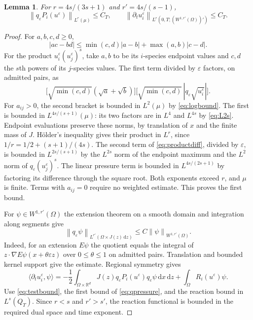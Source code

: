 \documentclass[11pt]{article}
\newtheorem{lemma}[theorem]{Lemma}
\newcommand{\R}{\mathbb R}
\newcommand{\eps}{\varepsilon}
\newcommand{\dd}{\,\mathrm d}
\newcommand{\Om}{\Omega}
\newcommand{\qe}{q_\eps}
\newcommand{\norm}[1]{\left\lVert#1\right\rVert}
\begin{document}
\begin{lemma}\label{lem:pressure}
For $r=4s/(3s+1)$ and $r'=4s/(s-1)$,
\begin{equation}\label{eq:qpressure}
 \norm{\qe P_i(u^\eps)}_{L^r(\mu)}\leq C_T,\qquad
 \norm{\partial_tu_i^\eps}_{L^r(0,T;(W^{1,r'}(\Om))')}\leq C_T.
\end{equation}
\end{lemma}
\begin{proof}
For $a,b,c,d\geq0$,
\begin{equation}\label{eq:productdiff}
 |ac-bd|\leq\min(c,d)|a-b|+\max(a,b)|c-d|.
\end{equation}
For the product $u_i^\eps(u_j^\eps)^s$, take $a,b$ to be its $i$-species
endpoint values and $c,d$ the $s$th powers of its $j$-species values.
The first term divided by $\eps$ factors, on admitted pairs, as
\[
 \bigl[\sqrt{\min(c,d)}(\sqrt a+\sqrt b)\bigr]
       \bigl[\sqrt{\min(c,d)}\,|\qe\sqrt{u_i^\eps}|\bigr].
\]
For $a_{ij}>0$, the second bracket is bounded in $L^2(\mu)$ by
\eqref{eq:logbound}. The first is bounded in $L^{4s/(s+1)}(\mu)$:
its two factors are in $L^4$ and $L^{4s}$ by \eqref{eq:L2s}.
Endpoint evaluations preserve these norms, by translation of $x$ and the
finite mass of $J$. H\"older's inequality gives their product in $L^r$,
since $1/r=1/2+(s+1)/(4s)$.
The second term of \eqref{eq:productdiff}, divided by $\eps$, is bounded
in $L^{2s/(s+1)}$ by the $L^{2s}$ norm of the endpoint maximum and the
$L^2$ norm of $\qe(u_j^\eps)^s$. The linear pressure term is bounded
in $L^{4s/(2s+1)}$ by factoring its difference through the square root.
Both exponents exceed $r$, and $\mu$ is finite. Terms with $a_{ij}=0$
require no weighted estimate. This proves the first bound.

For $\psi\in W^{1,r'}(\Om)$ the extension theorem on a smooth domain
\cite[Theorem 9.7]{Brezis} and integration along segments give
\begin{equation}\label{eq:testbound}
 \norm{\qe\psi}_{L^{r'}(\Om\times J(z)\dd z)}
                  \leq C\norm{\psi}_{W^{1,r'}(\Om)}.
\end{equation}
Indeed, for an extension $E\psi$ the quotient equals the integral of
$z\cdot\nabla E\psi(x+\theta\eps z)$ over $0\leq\theta\leq1$ on
admitted pairs. Translation and bounded kernel support give the estimate.
Regional symmetry gives
\begin{equation}\label{eq:bilinear}
 \langle\partial_tu_i^\eps,\psi\rangle
 =-\frac12\int_{\Om\times\R^d}J(z)\qe P_i(u^\eps)\qe\psi\dd x\dd z
                       +\int_\Om R_i(u^\eps)\psi.
\end{equation}
Use \eqref{eq:testbound}, the first bound of \eqref{eq:qpressure}, and
the reaction bound in $L^s(Q_T)$. Since $r<s$ and $r'>s'$, the reaction
functional is bounded in the required dual space and time exponent.
\end{proof}
\end{document}

